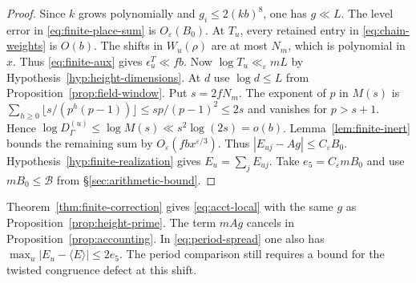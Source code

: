 \begin{proof}
Since $k$ grows polynomially and $g_i\le2(kb)^8$, one has $g\ll L$.
The level error in \eqref{eq:finite-place-sum} is $O_\varepsilon(B_0)$.
At $T_u$, every retained entry in \eqref{eq:chain-weights} is $O(b)$.
The shifts in $W_u(\rho)$ are at most $N_m$, which is polynomial in $x$.
Thus \eqref{eq:finite-aux} gives $\epsilon_u^T\ll fb$.
Now $\log T_u\ll_\varepsilon mL$ by Hypothesis~\ref{hyp:height-dimensions}.
At $d$ use $\log d\le L$ from Proposition~\ref{prop:field-window}.
Put $s=2fN_m$. The exponent of $p$ in $M(s)$ is
$\sum_{h\ge0}\lfloor s/(p^h(p-1))\rfloor\le sp/(p-1)^2\le2s$
and vanishes for $p>s+1$. Hence
$\log D_\Gamma^{(u)}\le\log M(s)\ll s^2\log(2s)=o(b)$.
Lemma~\ref{lem:finite-inert} bounds the remaining sum by
$O_\varepsilon(fb x^{\varepsilon/3})$. Thus
$|E_{uj}-Ag|\le C_\varepsilon B_0$. Hypothesis~\ref{hyp:finite-realization}
gives $E_u=\sum_jE_{uj}$. Take $e_5=C_\varepsilon mB_0$ and use
$mB_0\le\mathcal B$ from \S\ref{sec:arithmetic-bound}.
\end{proof}

Theorem~\ref{thm:finite-correction} gives \eqref{eq:acct-local} with the same $g$ as
Proposition~\ref{prop:height-prime}. The term $mAg$ cancels in
Proposition~\ref{prop:accounting}. In \eqref{eq:period-spread} one
also has $\max_u|E_u-\langle E\rangle|\le2e_5$. The period comparison
still requires a bound for the twisted congruence defect at this shift.
